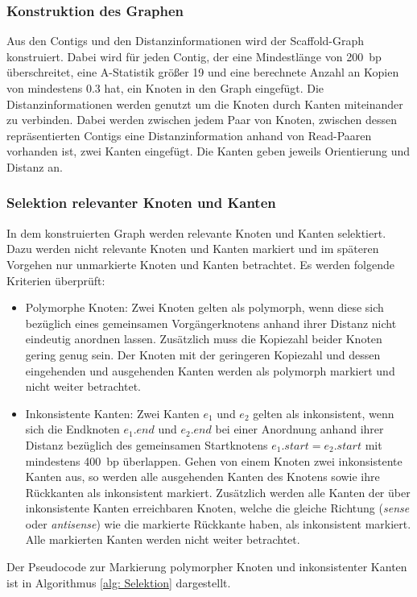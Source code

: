 \documentclass[a4paper,11pt,parskip,abstract=on]{scrartcl}
\begin{document}
\subsubsection{Konstruktion des Graphen}
Aus den Contigs und den Distanzinformationen wird der Scaffold-Graph
konstruiert. Dabei wird für jeden Contig, der eine Mindestlänge von
\SI{200}{bp} überschreitet, eine A-Statistik größer 19 und eine berechnete
Anzahl an Kopien von mindestens \num{0.3} hat, ein Knoten in den Graph
eingefügt. Die Distanzinformationen werden genutzt um die Knoten durch
Kanten miteinander zu verbinden. Dabei werden zwischen jedem Paar von
Knoten, zwischen dessen repräsentierten Contigs eine
Distanzinformation anhand von Read-Paaren vorhanden ist, zwei Kanten
eingefügt. Die Kanten geben jeweils Orientierung und Distanz an.

\subsubsection{Selektion relevanter Knoten und Kanten}
In dem konstruierten Graph werden relevante Knoten und Kanten
selektiert. Dazu werden nicht relevante Knoten und Kanten markiert und
im späteren Vorgehen nur unmarkierte Knoten und Kanten betrachtet. Es
werden folgende Kriterien überprüft:
\begin{itemize}
\item Polymorphe Knoten: Zwei Knoten gelten als polymorph, wenn diese
  sich bezüglich eines gemeinsamen Vorgängerknotens anhand ihrer
  Distanz nicht eindeutig anordnen lassen. Zusätzlich muss die
  Kopiezahl beider Knoten gering genug sein. Der Knoten mit der
  geringeren Kopiezahl und dessen eingehenden und ausgehenden Kanten
  werden als polymorph markiert und nicht weiter betrachtet.
\item Inkonsistente Kanten: Zwei Kanten $e_1$ und $e_2$ gelten als
  inkonsistent, wenn sich die Endknoten $e_1.end$ und $e_2.end$ bei
  einer Anordnung anhand ihrer Distanz bezüglich des gemeinsamen
  Startknotens $e_1.start = e_2.start$ mit mindestens \SI{400}{bp}
  überlappen. Gehen von einem Knoten zwei inkonsistente Kanten aus, so
  werden alle ausgehenden Kanten des Knotens sowie ihre Rückkanten als
  inkonsistent markiert. Zusätzlich werden alle Kanten der über
  inkonsistente Kanten erreichbaren Knoten, welche die gleiche Richtung
  (\textit{sense} oder \textit{antisense}) wie die markierte Rückkante
  haben, als inkonsistent markiert. Alle markierten Kanten werden
  nicht weiter betrachtet.
\end{itemize}
Der Pseudocode zur Markierung polymorpher Knoten und inkonsistenter
Kanten ist in Algorithmus \ref{alg: Selektion} dargestellt.
\end{document}
